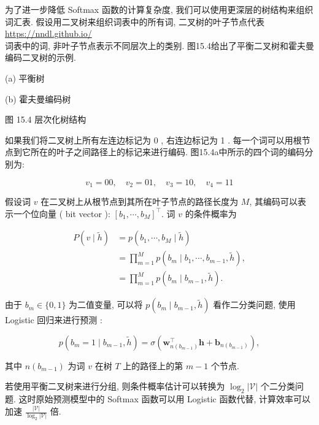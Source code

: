 \documentclass[10pt]{article}
\begin{document}
为了进一步降低 Softmax 函数的计算复杂度, 我们可以使用更深层的树结构来组织词汇表. 假设用二叉树来组织词表中的所有词, 二叉树的叶子节点代表 \href{https://nndl.github.io/}{https://nndl.github.io/}\\
词表中的词, 非叶子节点表示不同层次上的类别. 图15.4给出了平衡二叉树和霍夫曼编码二叉树的示例.



(a) 平衡树



(b) 霍夫曼编码树

图 15.4 层次化树结构

如果我们将二叉树上所有左连边标记为 0 , 右连边标记为 1 . 每一个词可以用根节点到它所在的叶子之间路径上的标记来进行编码. 图15.4a中所示的四个词的编码分别为:


\begin{equation*}
v_{1}=00, \quad v_{2}=01, \quad v_{3}=10, \quad v_{4}=11 \tag{15.53}
\end{equation*}


假设词 $v$ 在二叉树上从根节点到其所在叶子节点的路径长度为 $M$, 其编码可以表示一个位向量 ( bit vector ): $\left[b_{1}, \cdots, b_{M}\right]^{\top}$. 词 $v$ 的条件概率为


\begin{align*}
P(v \mid \tilde{h}) & =p\left(b_{1}, \cdots, b_{M} \mid \tilde{h}\right)  \tag{15.54}\\
& =\prod_{m=1}^{M} p\left(b_{m} \mid b_{1}, \cdots, b_{m-1}, \tilde{h}\right),  \tag{15.55}\\
& =\prod_{m=1}^{M} p\left(b_{m} \mid b_{m-1}, \tilde{h}\right) . \tag{15.56}
\end{align*}


由于 $b_{m} \in\{0,1\}$ 为二值变量, 可以将 $p\left(b_{m} \mid b_{m-1}, \tilde{h}\right)$ 看作二分类问题, 使用 Logistic 回归来进行预测 :


\begin{equation*}
p\left(b_{m}=1 \mid b_{m-1}, \tilde{h}\right)=\sigma\left(\boldsymbol{w}_{n\left(b_{m-1}\right)}^{\top} \boldsymbol{h}+\boldsymbol{b}_{n\left(b_{m-1}\right)}\right), \tag{15.57}
\end{equation*}


其中 $n\left(b_{m-1}\right)$ 为词 $v$ 在树 $T$ 上的路径上的第 $m-1$ 个节点.

若使用平衡二叉树来进行分组, 则条件概率估计可以转换为 $\log _{2}|\mathcal{V}|$ 个二分类问题. 这时原始预测模型中的 Softmax 函数可以用 Logistic 函数代替, 计算效率可以加速 $\frac{|\mathcal{V}|}{\log _{2}|\mathcal{V}|}$ 倍.
\end{document}
